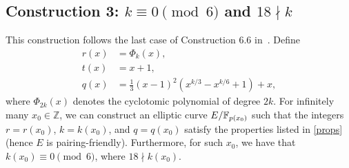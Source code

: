 \subsection{Construction 3: $k \equiv 0 \pmod{6}$ and $18 \nmid k$}
This construction follows the last case of Construction 6.6 in~\cite{2010/freeman}.
Define
\begin{align*}
r(x) &= \Phi_k(x),	\\
t(x) &= x+1,		\\
q(x) &= \frac{1}{3} (x-1)^2 (x^{k/3} - x^{k/6} + 1) + x,
\end{align*}
where $\Phi_{2k}(x)$ denotes the cyclotomic polynomial of degree $2k$. For infinitely many $x_{0}\in \mathbb{Z}$, we can construct an elliptic curve $E/\mathbb{F}_{p(x_{0})}$ such that the integers $r=r(x_{0})$, $k=k(x_{0})$, and $q=q(x_{0})$ satisfy the properties listed in \ref{props} (hence $E$ is pairing-friendly). Furthermore, for such $x_{0}$, we have that
$k(x_{0}) \equiv 0 \pmod{6}$, where $18 \nmid k(x_{0})$.



